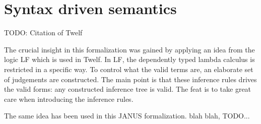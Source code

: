 \chapter{Syntax driven semantics}

TODO: Citation of Twelf

The crucial insight in this formalization was gained by applying an
idea from the logic LF which is used in Twelf. In LF, the dependently
typed lambda calculus is restricted in a specific way. To control what
the valid terms are, an elaborate set of judgements are
constructed. The main point is that these inference rules drives the
valid forms: any constructed inference tree is valid. The feat is to
take great care when introducing the inference rules.

The same idea has been used in this JANUS formalization. blah blah,
TODO...

